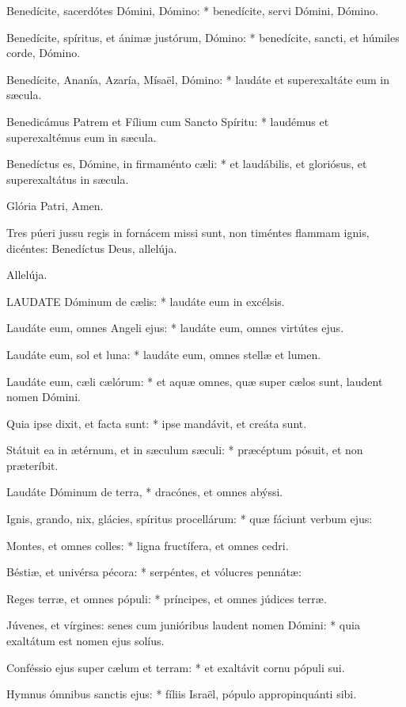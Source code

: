 Benedícite, sacerdótes Dómini, Dómino: * benedícite, servi Dómini, Dómino.

Benedícite, spíritus, et ánimæ justórum, Dómino: * benedícite, sancti, et húmiles corde, Dómino.

Benedícite, Ananía, Azaría, Mísaël, Dómino: * laudáte et superexaltáte eum in sæcula.

Benedicámus Patrem et Fílium cum Sancto Spíritu: * laudémus et superexaltémus eum in sæcula.

Benedíctus es, Dómine, in firmaménto cæli: * et laudábilis, et gloriósus, et superexaltátus in sæcula.

 Glória Patri,  Amen.

 Tres púeri jussu regis in fornácem missi sunt, non timéntes flammam ignis, dicéntes: Benedíctus Deus, allelúja.

 Allelúja.


\lettrine[lines=2]{L}{AUDATE} Dóminum de cælis: * laudáte eum in excélsis.

Laudáte eum, omnes Angeli ejus: * laudáte eum, omnes virtútes ejus.

Laudáte eum, sol et luna: * laudáte eum, omnes stellæ et lumen.

Laudáte eum, cæli cælórum: * et aquæ omnes, quæ super cælos sunt, laudent nomen Dómini.

Quia ipse dixit, et facta sunt: * ipse mandávit, et creáta sunt.

Státuit ea in ætérnum, et in sæculum sæculi: * præcéptum pósuit, et non præteríbit.

Laudáte Dóminum de terra, * dracónes, et omnes abýssi.

Ignis, grando, nix, glácies, spíritus procellárum: * quæ fáciunt verbum ejus:

Montes, et omnes colles: * ligna fructífera, et omnes cedri.

Béstiæ, et univérsa pécora: * serpéntes, et vólucres pennátæ:

Reges terræ, et omnes pópuli: * príncipes, et omnes júdices terræ.

Júvenes, et vírgines: senes cum junióribus laudent nomen Dómini: * quia exaltátum est nomen ejus solíus.

Conféssio ejus super cælum et terram: * et exaltávit cornu pópuli sui.

Hymnus ómnibus sanctis ejus: * fíliis Israël, pópulo appropinquánti sibi.

